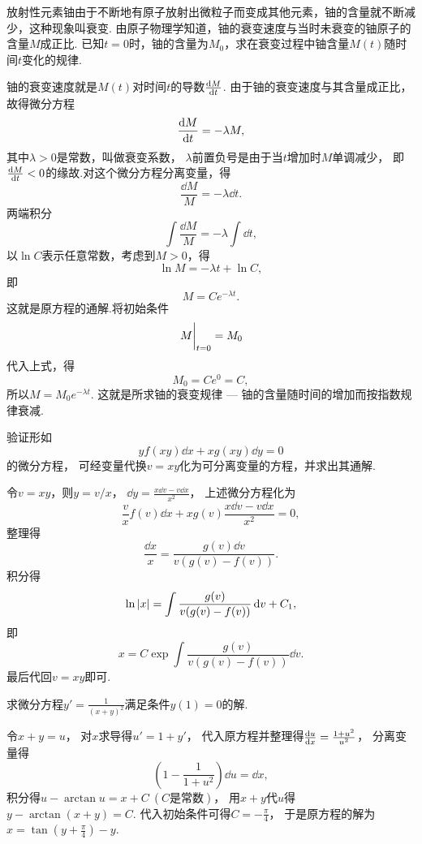 \begin{example}
放射性元素铀由于不断地有原子放射出微粒子而变成其他元素，铀的含量就不断减少，这种现象叫衰变.
由原子物理学知道，铀的衰变速度与当时未衰变的铀原子的含量\(M\)成正比.
已知\(t=0\)时，铀的含量为\(M_0\)，求在衰变过程中铀含量\(M(t)\)随时间\(t\)变化的规律.
\begin{solution}
铀的衰变速度就是\(M(t)\)对时间\(t\)的导数\(\dv{M}{t}\).
由于铀的衰变速度与其含量成正比，故得微分方程\[
	\dv{M}{t} = -\lambda M,
\]
其中\(\lambda > 0\)是常数，叫做衰变系数，
\(\lambda\)前置负号是由于当\(t\)增加时\(M\)单调减少，
即\(\dv{M}{t} < 0\)的缘故.对这个微分方程分离变量，得\[
	\frac{\dd{M}}{M} = -\lambda \dd{t}.
\]两端积分\[
	\int \frac{\dd{M}}{M} = -\lambda \int \dd{t},
\]
以\(\ln C\)表示任意常数，考虑到\(M>0\)，得\[
	\ln M = -\lambda t + \ln C,
\]
即\[
	M = C e^{-\lambda t}.
\]
这就是原方程的通解.将初始条件\[
	\eval{M}_{t=0} = M_0
\]
代入上式，得\[
	M_0 = C e^0 = C,
\]
所以\(M = M_0 e^{-\lambda t}\).
这就是所求铀的衰变规律 --- 铀的含量随时间的增加而按指数规律衰减.
\end{solution}
\end{example}

\begin{example}
验证形如\[
	y f(xy) \dd{x} + x g(xy) \dd{y} = 0
\]的微分方程，
可经变量代换\(v = xy\)化为可分离变量的方程，并求出其通解.
\begin{solution}
令\(v = xy\)，则\(y = v/x\)，
\(\dd{y} = \frac{x \dd{v} - v \dd{x}}{x^2}\)，
上述微分方程化为\[
	\frac{v}{x} f(v) \dd{x} + x g(v) \frac{x \dd{v} - v \dd{x}}{x^2} = 0,
\]
整理得\[
	\frac{\dd{x}}{x}
	= \frac{g(v) \dd{v}}{v (g(v) - f(v))}.
\]
积分得\[
	\ln\abs{x}
	= \int \frac{g(v)}{v (g(v) - f(v))} \dd{v} + C_1,
\]
即\[
	x = C \exp\int \frac{g(v)}{v (g(v) - f(v))} \dd{v}.
\]
最后代回\(v = xy\)即可.
\end{solution}
\end{example}

\begin{example}
求微分方程\(y'=\frac1{(x+y)^2}\)满足条件\(y(1)=0\)的解.
\begin{solution}
令\(x+y=u\)，
对\(x\)求导得\(u'=1+y'\)，
代入原方程并整理得\(\dv{u}{x}=\frac{1+u^2}{u^2}\)，
分离变量得\[
	\left( 1-\frac1{1+u^2} \right) \dd{u}
	= \dd{x},
\]
积分得\(u-\arctan u=x+C\ (\text{$C$是常数})\)，
用\(x+y\)代\(u\)得\(y-\arctan(x+y)=C\).
代入初始条件可得\(C=-\frac\pi4\)，
于是原方程的解为\(x=\tan\left(y+\frac\pi4\right)-y\).
\end{solution}
\end{example}

